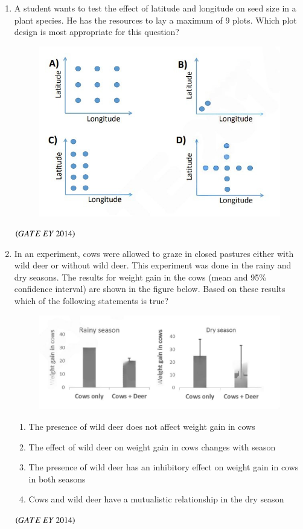 \documentclass[journal]{IEEEtran}
\numberwithin{equation}{enumi}
\numberwithin{figure}{enumi}
\begin{document}
\begin{enumerate}
    \item A student wants to test the effect of latitude and longitude on seed size in a plant species. He has the resources to lay a maximum of 9 plots. Which plot design is most appropriate for this question?
    \begin{figure}[H]
    \centering
    \includegraphics[width=0.7\columnwidth]{figs/15.png}
    \caption{}
    \label{fig:15}
   \end{figure}
    \hfill{$\brak{ GATE\ EY\ 2014}$}
    \bigskip
    
    \item In an experiment, cows were allowed to graze in closed pastures either with wild deer or without wild deer. This experiment was done in the rainy and dry seasons. The results for weight gain in the cows (mean and 95\% confidence interval) are shown in the figure below. Based on these results which of the following statements is true?
    \begin{figure}[H]
    \centering
    \includegraphics[width=0.7\columnwidth]{figs/16.png}
    \caption{}
    \label{fig:16}
   \end{figure}
    \begin{enumerate}
        \item The presence of wild deer does not affect weight gain in cows
        \item The effect of wild deer on weight gain in cows changes with season
        \item The presence of wild deer has an inhibitory effect on weight gain in cows in both seasons
        \item Cows and wild deer have a mutualistic relationship in the dry season
    \end{enumerate}
    \hfill{$\brak{ GATE\ EY\ 2014}$}
    \bigskip


\end{enumerate}
\end{document}
